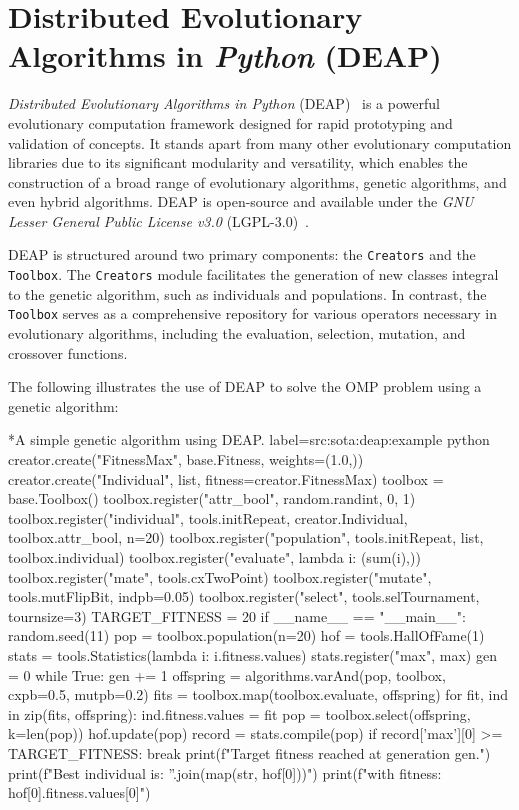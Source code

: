 \section{Distributed Evolutionary Algorithms in \textit{Python} (DEAP)}
\label{sec:sota:deap}

  \emph{Distributed Evolutionary Algorithms in Python} 
  (DEAP)~\autocite{DEAPDocumentationDEAP} is a powerful evolutionary computation
  framework designed for rapid prototyping and validation of concepts.
  It stands apart from many other evolutionary computation libraries due to its
  significant modularity and versatility, which enables the construction of a
  broad range of evolutionary algorithms, genetic algorithms, and even hybrid
  algorithms.
  DEAP is open-source and available under the \textit{GNU Lesser General Public
  License v3.0} (LGPL-3.0)~\autocite{GNULesserGeneral}.

  DEAP is structured around two primary components: the \texttt{Creators} and
  the \texttt{Toolbox}.
  The \texttt{Creators} module facilitates the generation of new classes
  integral to the genetic algorithm, such as individuals and populations.
  In contrast, the \texttt{Toolbox} serves as a comprehensive repository for
  various operators necessary in evolutionary algorithms, including the
  evaluation, selection, mutation, and crossover functions.

  The following illustrates the use of DEAP to solve the OMP problem using a
  genetic algorithm:

  \begin{code}*{A simple genetic algorithm using DEAP.}{
    label={src:sota:deap:example}
  }{python}
    creator.create("FitnessMax", base.Fitness, weights=(1.0,))
    creator.create("Individual", list, fitness=creator.FitnessMax)
    toolbox = base.Toolbox()
    toolbox.register("attr_bool", random.randint, 0, 1)
    toolbox.register("individual", tools.initRepeat, creator.Individual, toolbox.attr_bool, n=20)
    toolbox.register("population", tools.initRepeat, list, toolbox.individual)
    toolbox.register("evaluate", lambda i: (sum(i),))
    toolbox.register("mate", tools.cxTwoPoint)
    toolbox.register("mutate", tools.mutFlipBit, indpb=0.05)
    toolbox.register("select", tools.selTournament, tournsize=3)
    TARGET_FITNESS = 20
    if __name__ == "__main__":
        random.seed(11)
        pop = toolbox.population(n=20)
        hof = tools.HallOfFame(1)
        stats = tools.Statistics(lambda i: i.fitness.values)
        stats.register("max", max)
        gen = 0
        while True:
            gen += 1
            offspring = algorithms.varAnd(pop, toolbox, cxpb=0.5, mutpb=0.2)
            fits = toolbox.map(toolbox.evaluate, offspring)
            for fit, ind in zip(fits, offspring):
                ind.fitness.values = fit
            pop = toolbox.select(offspring, k=len(pop))
            hof.update(pop)
            record = stats.compile(pop)
            if record['max'][0] >= TARGET_FITNESS:
                break
        print(f"Target fitness reached at generation {gen}.")
        print(f"Best individual is: {''.join(map(str, hof[0]))}")
        print(f"with fitness: {hof[0].fitness.values[0]}")
  \end{code}


